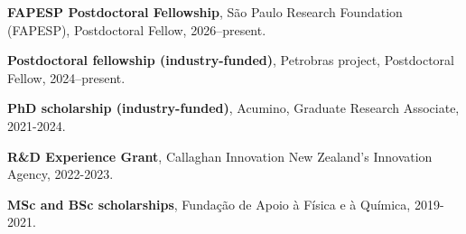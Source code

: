 \vspace{8pt} 
\begin{cvitems}
  \item {\textbf{FAPESP Postdoctoral Fellowship}, São Paulo Research Foundation (FAPESP), Postdoctoral Fellow, 2026–present.}
  \item {\textbf{Postdoctoral fellowship (industry-funded)}, Petrobras project, Postdoctoral Fellow, 2024–present.}
  \item {\textbf{PhD scholarship (industry-funded)}, Acumino, Graduate Research Associate, 2021-2024.}
  \item {\textbf{R\&D Experience Grant}, Callaghan Innovation New Zealand's Innovation Agency, 2022-2023.}
  \item {\textbf{MSc and BSc scholarships}, Fundação de Apoio à Física e à Química, 2019-2021.}
\end{cvitems}
\vspace{5pt} 
